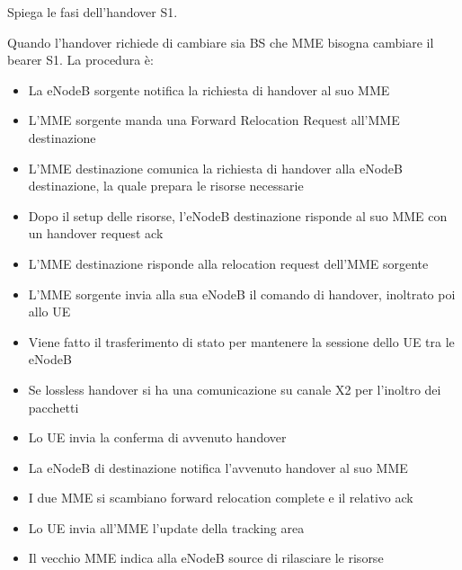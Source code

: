 \begin{questions}
    \question Spiega le fasi dell'handover S1.
    
    \begin{solution}
        Quando l'handover richiede di cambiare sia BS che MME bisogna cambiare il bearer S1. La procedura è: 
        \begin{itemize}
            \item La eNodeB sorgente notifica la richiesta di handover al suo MME
            
            \item L'MME sorgente manda una Forward Relocation Request all'MME destinazione
            
            \item L'MME destinazione comunica la richiesta di handover alla eNodeB destinazione, la quale prepara le risorse necessarie
            
            \item Dopo il setup delle risorse, l'eNodeB destinazione risponde al suo MME con un handover request ack
            
            \item L'MME destinazione risponde alla relocation request dell'MME sorgente
            
            \item L'MME sorgente invia alla sua eNodeB il comando di handover, inoltrato poi allo UE
            
            \item Viene fatto il trasferimento di stato per mantenere la sessione dello UE tra le eNodeB
            
            \item Se lossless handover si ha una comunicazione su canale X2 per l'inoltro dei pacchetti
            
            \item Lo UE invia la conferma di avvenuto handover
            
            \item La eNodeB di destinazione notifica l'avvenuto handover al suo MME
            
            \item I due MME si scambiano forward relocation complete e il relativo ack
            
            \item Lo UE invia all'MME l'update della tracking area
            
            \item Il vecchio MME indica alla eNodeB source di rilasciare le risorse
        \end{itemize}
    \end{solution}
\end{questions}